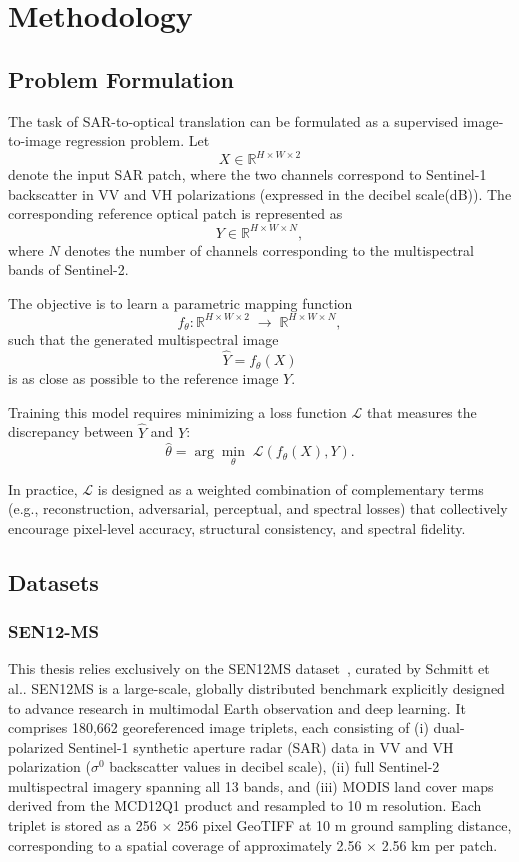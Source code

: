 \chapter{Methodology}
\section{Problem Formulation}

The task of SAR-to-optical translation can be formulated as a supervised image-to-image regression problem. Let
\[
X \in \mathbb{R}^{H \times W \times 2}
\]
denote the input SAR patch, where the two channels correspond to Sentinel-1 backscatter in VV and VH polarizations (expressed in the decibel scale(dB)). The corresponding reference optical patch is represented as
\[
Y \in \mathbb{R}^{H \times W \times N},
\]
where \(N\) denotes the number of channels corresponding to the multispectral bands of {Sentinel-2}.

The objective is to learn a parametric mapping function
\[
f_\theta : \mathbb{R}^{H \times W \times 2} \; \rightarrow \; \mathbb{R}^{H \times W \times N},
\]
such that the generated multispectral image
\[
\hat{Y} = f_\theta(X)
\]
is as close as possible to the reference image \( Y \).

Training this model requires minimizing a loss function \(\mathcal{L}\) that measures the discrepancy between \(\hat{Y}\) and \(Y\):
\[
\hat{\theta} = \arg\min_\theta \; \mathcal{L}(f_\theta(X), Y).
\]

In practice, \(\mathcal{L}\) is designed as a weighted combination of complementary terms (e.g., reconstruction, adversarial, perceptual, and spectral losses) that collectively encourage pixel-level accuracy, structural consistency, and spectral fidelity.

\section{Datasets}
\subsection{SEN12-MS}
This thesis relies exclusively on the SEN12MS dataset~\cite{sen12ms_2019}, curated by Schmitt et al.. SEN12MS is a large-scale, globally distributed benchmark explicitly designed to advance research in multimodal Earth observation and deep learning. It comprises 180,662 georeferenced image triplets, each consisting of (i) dual-polarized Sentinel-1 synthetic aperture radar (SAR) data in VV and VH polarization ($\sigma^{0}$ backscatter values in decibel scale), (ii) full Sentinel-2 multispectral imagery spanning all 13 bands, and (iii) MODIS land cover maps derived from the MCD12Q1 product and resampled to 10 m resolution. Each triplet is stored as a 256 × 256 pixel GeoTIFF at 10 m ground sampling distance, corresponding to a spatial coverage of approximately 2.56 × 2.56 km per patch.

